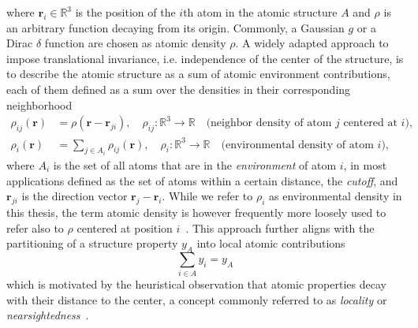 where $\mathbf{r}_i\in\mathbb{R}^3$ is the position of the $i$th atom in the atomic structure $A$ and $\rho$ is an arbitrary function decaying from its origin. 
Commonly, a Gaussian $g$ or a Dirac $\delta$ function are chosen as atomic density $\rho$.
A widely adapted approach to impose translational invariance, i.e. independence of the center of the structure, is to describe the atomic structure as a sum of atomic environment contributions, each of them defined as a sum over the densities in their corresponding neighborhood
\begin{subequations}
\begin{align}
  \rho_{ij}(\mathbf{r}) &= \rho(\mathbf{r}-\mathbf{r}_{ji}),\quad \rho_{ij}:\mathbb{R}^3\rightarrow\mathbb{R}\quad\text{(neighbor density of atom $j$ centered at $i$)},
  \label{eq:neighbor_density} \\
  \rho_i(\mathbf{r}) &= \sum_{j\in A_i} \rho_{ij}(\mathbf{r}),\quad \rho_i:\mathbb{R}^3\rightarrow\mathbb{R}\quad\text{(environmental density of atom $i$)},
  \label{eq:density_atomic_contributions}
\end{align}
\end{subequations}
where $A_i$ is the set of all atoms that are in the \emph{environment} of atom
$i$, in most applications defined as the set of atoms within a certain distance, the
\emph{cutoff}, and $\mathbf{r}_{ji}$ is the direction vector $\mathbf{r}_j-\mathbf{r}_i$. 
While we refer to $\rho_i$ as environmental density in this thesis, the term atomic density is however frequently more loosely used to refer also to $\rho$ centered at position $i$~\cite{musil2021physics}.
This approach further aligns with the partitioning of a structure property $y_A$ into local atomic contributions
\begin{equation}
  \label{eq:structural_separation}
  \sum_{i\in A} y_i = y_A
\end{equation}
which is motivated by the heuristical observation that atomic properties decay with their distance to the center, a concept commonly referred to as \emph{locality} or \emph{nearsightedness}~\cite{prodan2005nearsightedness}.
